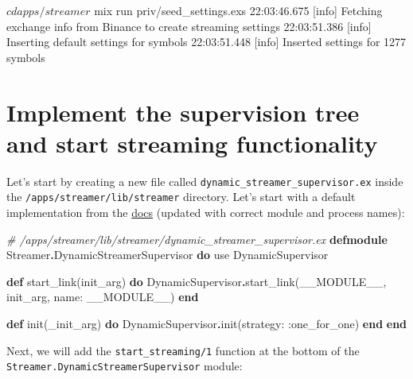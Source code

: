 \documentclass[
]{book}
\newenvironment{Shaded}{\begin{snugshade}}{\end{snugshade}}
\newcommand{\CommentTok}[1]{\textcolor[rgb]{0.56,0.35,0.01}{\textit{#1}}}
\newcommand{\ConstantTok}[1]{\textcolor[rgb]{0.00,0.00,0.00}{#1}}
\newcommand{\ExtensionTok}[1]{#1}
\newcommand{\ImportTok}[1]{#1}
\newcommand{\KeywordTok}[1]{\textcolor[rgb]{0.13,0.29,0.53}{\textbf{#1}}}
\newcommand{\NormalTok}[1]{#1}
\newcommand{\OperatorTok}[1]{\textcolor[rgb]{0.81,0.36,0.00}{\textbf{#1}}}
\newcommand{\VariableTok}[1]{\textcolor[rgb]{0.00,0.00,0.00}{#1}}
\begin{document}
\begin{Shaded}
\begin{Highlighting}[]
\ExtensionTok{$}\NormalTok{ cd apps/streamer}
\ExtensionTok{$}\NormalTok{ mix run priv/seed\_settings.exs}
\ExtensionTok{22:03:46.675}\NormalTok{ [info]  Fetching exchange info from Binance to create streaming settings}
\ExtensionTok{22:03:51.386}\NormalTok{ [info]  Inserting default settings for symbols}
\ExtensionTok{22:03:51.448}\NormalTok{ [info]  Inserted settings for 1277 symbols}
\end{Highlighting}
\end{Shaded}

\hypertarget{implement-the-supervision-tree-and-start-streaming-functionality}{%
\section{Implement the supervision tree and start streaming functionality}\label{implement-the-supervision-tree-and-start-streaming-functionality}}

Let's start by creating a new file called \texttt{dynamic\_streamer\_supervisor.ex} inside the \texttt{/apps/streamer/lib/streamer} directory. Let's start with a default implementation from the \href{https://hexdocs.pm/elixir/master/DynamicSupervisor.html\#module-module-based-supervisors}{docs} (updated with correct module and process names):

\begin{Shaded}
\begin{Highlighting}[]
\CommentTok{\# /apps/streamer/lib/streamer/dynamic\_streamer\_supervisor.ex}
\KeywordTok{defmodule} \ConstantTok{Streamer}\OperatorTok{.}\ConstantTok{DynamicStreamerSupervisor} \KeywordTok{do}
  \ImportTok{use} \ConstantTok{DynamicSupervisor}

  \KeywordTok{def}\NormalTok{ start\_link(init\_arg) }\KeywordTok{do}
    \ConstantTok{DynamicSupervisor}\OperatorTok{.}\NormalTok{start\_link(}\ConstantTok{\_\_MODULE\_\_}\NormalTok{, init\_arg, }\VariableTok{name:} \ConstantTok{\_\_MODULE\_\_}\NormalTok{)}
  \KeywordTok{end}

  \KeywordTok{def}\NormalTok{ init(\_init\_arg) }\KeywordTok{do}
    \ConstantTok{DynamicSupervisor}\OperatorTok{.}\NormalTok{init(}\VariableTok{strategy:} \VariableTok{:one\_for\_one}\NormalTok{)}
  \KeywordTok{end}
\KeywordTok{end}
\end{Highlighting}
\end{Shaded}

Next, we will add the \texttt{start\_streaming/1} function at the bottom of the \texttt{Streamer.DynamicStreamerSupervisor} module:
\end{document}
